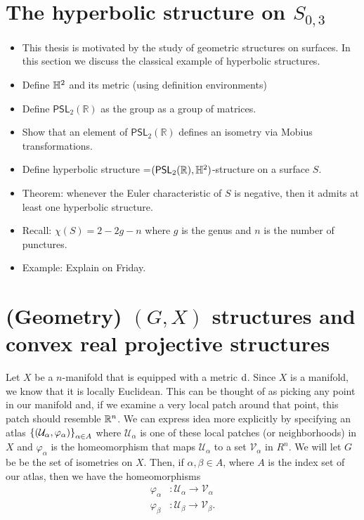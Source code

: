 \documentclass{amsart}
\begin{document}
\section{The hyperbolic structure on $S_{0,3}$}

\begin{itemize}
	\item This thesis is motivated by the study of geometric structures on surfaces. In this section we discuss the classical example of hyperbolic structures.
	\item Define $\mathbb{H}^2$ and its metric (using definition environments)
	\item Define $\mathsf{PSL}_2(\mathbb R)$ as the group as a group of matrices.
	\item Show that an element of $\mathsf{PSL}_2(\mathbb R)$ defines an isometry via Mobius transformations. 
	\item Define hyperbolic structure =$(\mathsf{PSL}_2(\mathbb R),\mathbb{H}^2)$-structure on a surface $S$.
	\item Theorem: whenever the Euler characteristic of $S$ is negative, then it admits at least one hyperbolic structure.
	\item Recall: $\chi(S)=2-2g-n$ where $g$ is the genus and $n$ is the number of punctures.
	\item Example: Explain on Friday.
\end{itemize}

\section{(Geometry) $(G,X)$ structures and convex real projective structures}

Let $X$ be a $n$-manifold that is equipped with a metric $\operatorname{d}$. Since $X$ is a manifold, we know that it is locally Euclidean. This can be thought of as picking any point in our manifold and, if we examine a very local patch around that point, this patch should resemble $\mathbb{R}^n$. We can express idea more explicitly by specifying an atlas $\left\{(\mathcal{U}_\alpha, \varphi_\alpha)\right\}_{\alpha \in A}$ where $\mathcal{U}_\alpha$ is one of these local patches (or neighborhoods) in $X$ and $\varphi_\alpha$ is the homeomorphism that maps $\mathcal{U}_\alpha$ to a set $\mathcal{V}_\alpha$ in $R^n$. We will let $G$ be be the set of isometries on $X$. Then, if $\alpha, \beta \in A$, where $A$ is the index set of our atlas, then we have the homeomorphisms
\begin{equation*}
	\begin{split}
		\varphi_\alpha &\colon \mathcal{U}_\alpha \to \mathcal{V}_\alpha \\
		\varphi_\beta &\colon \mathcal{U}_\beta \to \mathcal{V}_\beta.
	\end{split}
\end{equation*}
\end{document}
